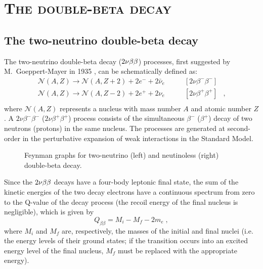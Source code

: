 \chapter{\textsc{The double-beta decay}}
\section*{The two-neutrino double-beta decay}
The two-neutrino double-beta decay ($2\nu\beta\beta$) processes, first suggested by M.~Goeppert-Mayer in 1935 \cite{PhysRev.48.512}, can be schematically defined as:
\[\begin{array}{lrl}
		\mathcal{N}(A,Z)\longrightarrow \mathcal{N}(A,Z+2)+2e^-+2\bar{\nu}_e & \qquad [2\nu\beta^-\beta^-] & \\
		\mathcal{N}(A,Z)\longrightarrow \mathcal{N}(A,Z-2)+2e^++2\nu_e & \qquad [2\nu\beta^+\beta^+] & ,\\
\end{array}\]
where $\mathcal{N}(A,Z)$ represents a nucleus with mass number $A$ and atomic number $Z$. A $2\nu\beta^-\beta^-$ ($2\nu\beta^+\beta^+$) process consists of the simultaneous $\beta^-$ ($\beta^+$) decay of two neutrons (protons) in the same nucleus. The processes are generated at second-order in the perturbative expansion of weak interactions in the Standard Model.
\begin{figure}
	\centering%
	\makebox[\textwidth]{%
	}%
	\caption{Feynman graphs for two-neutrino (left) and neutinoless (right) double-beta decay.}
	\label{fig:nbbfey}
\end{figure}

Since the $2\nu\beta\beta$ decays have a four-body leptonic final state, the sum of the kinetic energies of the two decay electrons have a continuous spectrum from zero to the Q-value of the decay process (the recoil energy of the final nucleus is negligible), which is given by
\[Q_{\beta\beta}=M_i-M_f-2m_e\;,\]
where $M_i$ and $M_f$ are, respectively, the masses of the initial and final nuclei (i.e. the energy levels of their ground states; if the transition occurs into an excited energy level of the final nucleus, $M_f$ must be replaced with the appropriate energy). 

